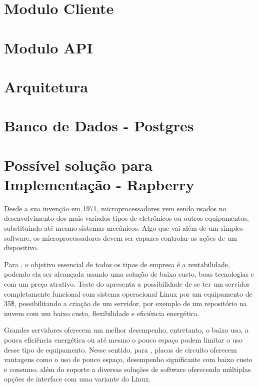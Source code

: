\section{Modulo Cliente}
\section{Modulo API}
\section{Arquitetura}
\section{Banco de Dados - Postgres}
\section{Possível solução para Implementação - Rapberry}
Desde a sua invenção em 1971, microprocessadores vem sendo usados no desenvolvimento dos mais variados tipos de eletrônicos ou outros equipamentos, substituindo até mesmo sistemas mecânicos. Algo que vai além de um simples software, os microprocessadores devem ser capazes controlar as ações de um dispositivo. \cite{rosenstark2007}

Para \cite{aristotelous2016}, o objetivo essencial de todos os tipos de empresa é a rentabilidade, podendo ela ser alcançada usando uma solução de baixo custo, boas tecnologias e com um preço atrativo. Teste do \cite{aristotelous2016} apresenta a possibilidade de se ter um servidor completamente funcional com sistema operacional Linux por um equipamento de 35\$, possibilitando a criação de um servidor, por exemplo de um repositório na nuvem com um baixo custo, flexibilidade e eficiência energética. 

Grandes servidores oferecem um melhor desempenho, entretanto, o baixo uso, a pouca eficiência energética ou até mesmo o pouco espaço podem limitar o uso desse tipo de equipamento. Nesse sentido, para \cite{Cusick}, placas de circuito oferecem vantagens como o uso de pouco espaço, desempenho significante com baixo custo e consumo, além do suporte a diversas soluções de software oferecendo múltiplas opções de interface com uma variante do Linux. 